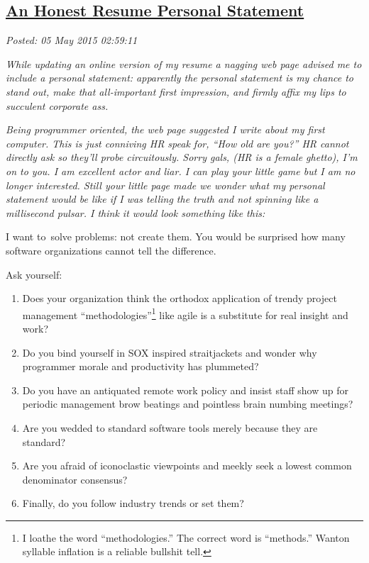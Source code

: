 %

\subsection*{\href{https://bakerjd99.wordpress.com/2015/05/04/an-honest-resume-personal-statement/}{An Honest Resume Personal Statement}}


\noindent\emph{Posted: 05 May 2015 02:59:11}
\vspace{6pt}

\emph{While updating an online version of my resume a nagging web page
advised me to include a personal statement: apparently the personal
statement is my chance to stand out, make that all-important first
impression, and firmly affix my lips to succulent corporate ass.}

\emph{Being programmer oriented, the web page suggested I write about my
first computer. This is just conniving HR speak for, ``How old are you?'' HR
cannot directly ask so they'll probe circuitously. Sorry gals, (HR is a
female ghetto), I'm on to you. I am excellent actor and liar. I can play
your little game but I am no longer interested. Still your little page
made we wonder what my personal statement would be like if I was telling
the truth and not spinning like a millisecond pulsar. I think it would
look something like this:}


\medskip \hrulefill \medskip

I want to~solve problems: not create them. You would be surprised how
many software organizations cannot tell the difference.

Ask yourself:

\begin{enumerate}
\itemsep2pt\parskip0pt
\item
  Does your organization think the orthodox application of trendy
  project management
  ``methodologies''\footnote{I loathe the word ``methodologies.'' The correct word is ``methods.''
  Wanton syllable inflation is a reliable bullshit tell.} %
  like agile is a substitute for real insight and work?
\item
  Do you bind yourself in SOX inspired straitjackets and wonder why
  programmer morale and productivity has plummeted?
\item
  Do you have an antiquated remote work policy and insist staff show up
  for periodic management brow beatings and pointless brain numbing
  meetings?
\item
  Are you wedded to standard software tools merely because they are
  standard?
\item
  Are you afraid of iconoclastic viewpoints and meekly seek a lowest
  common denominator consensus?
\item
  Finally, do you follow industry trends or set them?
\end{enumerate}

